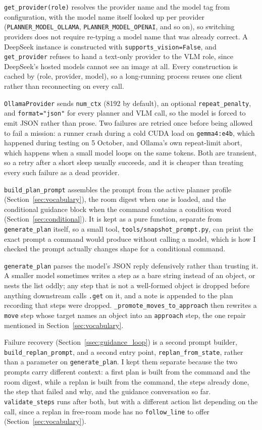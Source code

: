 \texttt{get\_provider(role)} resolves the provider name and the model tag from
configuration, with the model name itself looked up per provider
(\texttt{PLANNER\_MODEL\_OLLAMA}, \texttt{PLANNER\_MODEL\_OPENAI}, and so on), so
switching providers does not require re-typing a model name that was already
correct. A DeepSeek instance is constructed with \texttt{supports\_vision=False},
and \texttt{get\_provider} refuses to hand a text-only provider to the VLM role,
since DeepSeek's hosted models cannot see an image at all. Every construction is
cached by (role, provider, model), so a long-running process reuses one client
rather than reconnecting on every call.

\texttt{OllamaProvider} sends \texttt{num\_ctx} (8192 by default), an optional
\texttt{repeat\_penalty}, and \texttt{format="json"} for every planner and VLM
call, so the model is forced to emit JSON rather than prose. Two failures are
retried once before being allowed to fail a mission: a runner crash during a cold
CUDA load on \texttt{gemma4:e4b}, which happened during testing on 5 October, and
Ollama's own repeat-limit abort, which happens when a small model loops on the
same tokens. Both are transient, so a retry after a short sleep usually succeeds,
and it is cheaper than treating every such failure as a dead provider.

\texttt{build\_plan\_prompt} assembles the prompt from the active planner
profile (Section~\ref{sec:vocabulary}), the room digest when one is loaded, and
the conditional guidance block when the command contains a condition word
(Section~\ref{sec:conditional}). It is kept as a pure function, separate from
\texttt{generate\_plan} itself, so a small tool,
\texttt{tools/snapshot\_prompt.py}, can print the exact prompt a command would
produce without calling a model, which is how I checked the prompt actually
changes shape for a conditional command.

\texttt{generate\_plan} parses the model's JSON reply defensively rather than
trusting it. A smaller model sometimes writes a step as a bare string instead of
an object, or nests the list oddly; any step that is not a well-formed object is
dropped before anything downstream calls \texttt{.get} on it, and a note is
appended to the plan recording that steps were dropped. \texttt{\_promote\_moves\_to\_approach}
then rewrites a \texttt{move} step whose target names an object into an
\texttt{approach} step, the one repair mentioned in
Section~\ref{sec:vocabulary}.

Failure recovery (Section~\ref{ssec:guidance_loop}) is a second prompt builder,
\texttt{build\_replan\_prompt}, and a second entry point,
\texttt{replan\_from\_state}, rather than a parameter on \texttt{generate\_plan}.
I kept them separate because the two prompts carry different context: a first
plan is built from the command and the room digest, while a replan is built from
the command, the steps already done, the step that failed and why, and the
guidance conversation so far. \texttt{validate\_steps} runs after both, but with
a different action list depending on the call, since a replan in free-roam mode
has no \texttt{follow\_line} to offer (Section~\ref{sec:vocabulary}).

